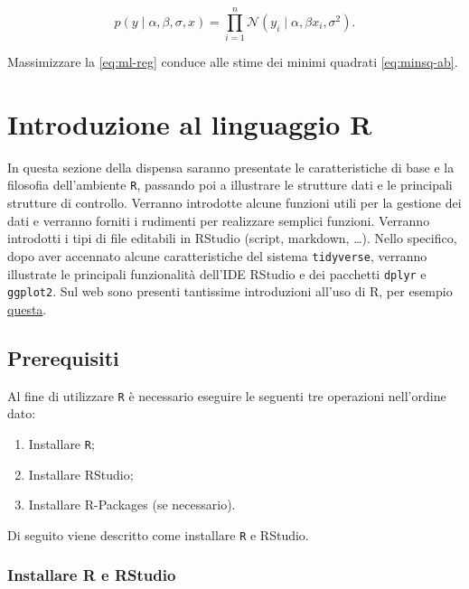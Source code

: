 \documentclass[
]{memoir}
\providecommand{\tightlist}{%
  \setlength{\itemsep}{0pt}\setlength{\parskip}{0pt}}
\theoremstyle{definition}
\theoremstyle{definition}
\theoremstyle{definition}
\theoremstyle{definition}
\theoremstyle{remark}
\begin{document}
\begin{equation}
p(y \mid \alpha, \beta, \sigma, x) = \prod_{i=1}^n \mathcal{N}(y_i \mid \alpha, \beta x_i, \sigma^2). 
\label{eq:ml-reg}
\end{equation}

Massimizzare la \eqref{eq:ml-reg} conduce alle stime dei minimi quadrati \eqref{eq:minsq-ab}.

\hypertarget{introduzione-al-linguaggio-r}{%
\chapter{Introduzione al linguaggio R}\label{introduzione-al-linguaggio-r}}

In questa sezione della dispensa saranno presentate le caratteristiche di base e la filosofia dell'ambiente \texttt{R}, passando poi a illustrare le strutture dati e le principali strutture di controllo. Verranno introdotte alcune funzioni utili per la gestione dei dati e verranno forniti i rudimenti per realizzare semplici funzioni. Verranno introdotti i tipi di file editabili in RStudio (script, markdown, \ldots). Nello specifico, dopo aver accennato alcune caratteristiche del sistema \texttt{tidyverse}, verranno illustrate le principali funzionalità dell'IDE RStudio e dei pacchetti \texttt{dplyr} e \texttt{ggplot2}. Sul web sono presenti tantissime introduzioni all'uso di R, per esempio \href{https://bookdown.org/hneth/ds4psy/}{questa}.

\hypertarget{prerequisiti}{%
\section{Prerequisiti}\label{prerequisiti}}

Al fine di utilizzare \texttt{R} è necessario eseguire le seguenti tre operazioni
nell'ordine dato:

\begin{enumerate}
\def\labelenumi{\arabic{enumi}.}
\tightlist
\item
  Installare \texttt{R};
\item
  Installare RStudio;
\item
  Installare R-Packages (se necessario).
\end{enumerate}

Di seguito viene descritto come installare \texttt{R} e RStudio.

\hypertarget{installare-r-e-rstudio}{%
\subsection{Installare R e RStudio}\label{installare-r-e-rstudio}}
\end{document}
